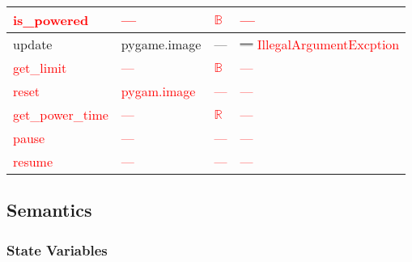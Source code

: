 \documentclass[12pt]{article}
\begin{document}
{\begin{tabular}{| l | l | l | l |}
\hline
\textcolor{red}{is\_powered} & \textcolor{red}{---} & \textcolor{red}{$\mathbb{B}$} & \textcolor{red}{---}\\
\hline
update & pygame.image & --- & \sout{---} \textcolor{red}{IllegalArgumentExcption}\\
\hline
\textcolor{red}{get\_limit} & \textcolor{red}{---} & \textcolor{red}{$\mathbb{B}$} & \textcolor{red}{---}\\
\hline
\textcolor{red}{reset} & \textcolor{red}{pygam.image} & \textcolor{red}{---} & \textcolor{red}{---}\\
\hline
\textcolor{red}{get\_power\_time} & \textcolor{red}{---} & \textcolor{red}{$\mathbb{R}$} & \textcolor{red}{---}\\
\hline
\textcolor{red}{pause} & \textcolor{red}{---} & \textcolor{red}{---} & \textcolor{red}{---}\\
\hline
\textcolor{red}{resume} & \textcolor{red}{---} & \textcolor{red}{---} & \textcolor{red}{---}\\
\hline
\end{tabular}
}

\subsection* {Semantics}

\subsubsection* {State Variables}
\end{document}
